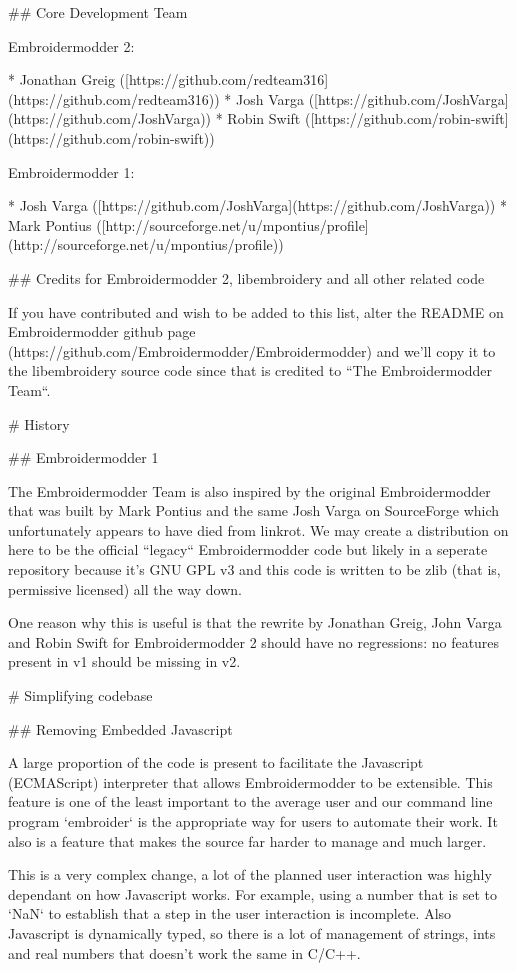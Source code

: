 ## Core Development Team

Embroidermodder 2:

* Jonathan Greig ([https://github.com/redteam316](https://github.com/redteam316))
* Josh Varga ([https://github.com/JoshVarga](https://github.com/JoshVarga))
* Robin Swift ([https://github.com/robin-swift](https://github.com/robin-swift))

Embroidermodder 1:

* Josh Varga ([https://github.com/JoshVarga](https://github.com/JoshVarga))
* Mark Pontius ([http://sourceforge.net/u/mpontius/profile](http://sourceforge.net/u/mpontius/profile))

## Credits for Embroidermodder 2, libembroidery and all other related code

If you have contributed and wish to be added to this list, alter the  README on Embroidermodder
github page (https://github.com/Embroidermodder/Embroidermodder) and we'll copy it to the
libembroidery source code since that is credited to ``The Embroidermodder Team``.

# History

## Embroidermodder 1

The Embroidermodder Team is also inspired by the original Embroidermodder that
was built by Mark Pontius and the same Josh Varga on SourceForge which
unfortunately appears to have died from linkrot. We may create a distribution
on here to be the official ``legacy`` Embroidermodder code but likely in a
seperate repository because it's GNU GPL v3 and this code is written to be
zlib (that is, permissive licensed) all the way down.

One reason why this is useful is that the rewrite by Jonathan Greig, John Varga
and Robin Swift for Embroidermodder 2 should have no regressions: no features
present in v1 should be missing in v2.

# Simplifying codebase

## Removing Embedded Javascript

A large proportion of the code is present to facilitate the Javascript (ECMAScript) interpreter
that allows Embroidermodder to be extensible. This feature is one of the least important to
the average user and our command line program `embroider` is the appropriate way for users
to automate their work. It also is a feature that makes the source far harder to manage and
much larger.

This is a very complex change, a lot of the planned user interaction was highly dependant on
how Javascript works. For example, using a number that is set to `NaN` to establish that a
step in the user interaction is incomplete. Also Javascript is dynamically typed, so there is
a lot of management of strings, ints and real numbers that doesn't work the same in C/C++.

